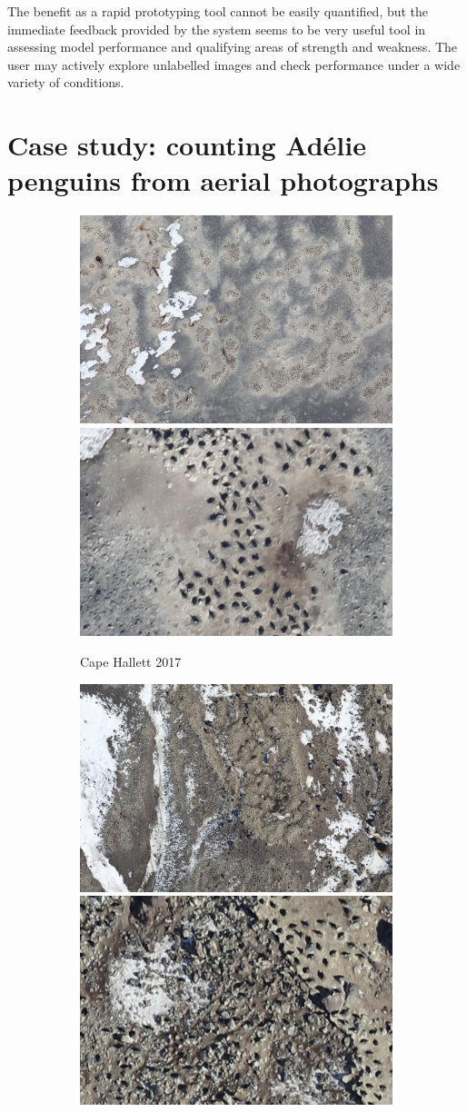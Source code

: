 The benefit as a rapid prototyping tool cannot be easily quantified, but the immediate feedback provided by the system seems to be very useful tool in assessing model performance and qualifying areas of strength and weakness. The user may actively explore unlabelled images and check performance under a wide variety of conditions.


\section{Case study: counting Ad\'elie penguins from aerial photographs}
\label{sec:case_penguins}

\begin{figure}[H]
\centering
\begin{subfigure}[t]{1.0\linewidth}
  \includegraphics[width=0.475\linewidth]{figures/annotation/penguin/hallet_large.jpg}
  \hfill
  \includegraphics[width=0.475\linewidth]{figures/annotation/penguin/hallet.jpg}
  \caption{Cape Hallett 2017}
\end{subfigure}
\begin{subfigure}[t]{1.0\linewidth}
  \includegraphics[width=0.475\linewidth]{figures/annotation/penguin/cotter_large.jpg}
  \hfill 
  \includegraphics[width=0.475\linewidth]{figures/annotation/penguin/cotter.jpg}

\end{subfigure}
\end{figure}
